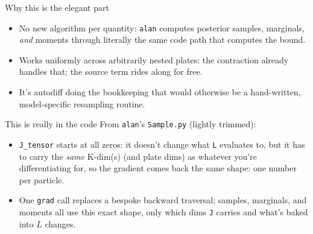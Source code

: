 \documentclass[aspectratio=169]{beamer}
\begin{document}
\begin{frame}{Why this is the elegant part}
  \begin{itemize}
    \item No new algorithm per quantity: \texttt{alan} computes
      posterior samples, marginals, \emph{and} moments through literally the
      same code path that computes the bound.
    \item Works uniformly across arbitrarily nested plates: the
      contraction already handles that; the source term rides along for
      free.
    \item It's autodiff doing the bookkeeping that would otherwise be a
      hand-written, model-specific resampling routine.
  \end{itemize}
\end{frame}

\begin{frame}[fragile]{This is really in the code}
  From \texttt{alan}'s \texttt{Sample.py} (lightly trimmed):
  \begin{center}
  \end{center}
  \vfill
  \begin{itemize}
    \item \texttt{J\_tensor} starts at all zeros: it doesn't change what
      \texttt{L} evaluates to, but it has to carry the \emph{same} K-dim(s)
      (and plate dims) as whatever you're differentiating for, so the
      gradient comes back the same shape: one number per particle.
    \item One \texttt{grad} call replaces a bespoke backward traversal;
      samples, marginals, and moments all use this exact shape, only which
      dims \texttt{J} carries and what's baked into $L$ changes.
  \end{itemize}
\end{frame}
\end{document}
